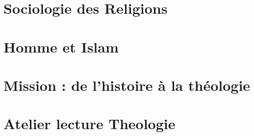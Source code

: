 \documentclass[oneside,10pt]{book}
\begin{document}
 







\setcounter{page}{1}
 



%
%

% 
%
%
%

%
%

% 
 
 
 
 
\part{Sociologie des Religions}
 
 
 
 \part{Homme et Islam}
 
 
 \part{Mission : de l'histoire à la théologie}
 
 
 

 
 
  \part{Atelier lecture Theologie}
 
 
  


%

\printbibliography

%
\end{document}
